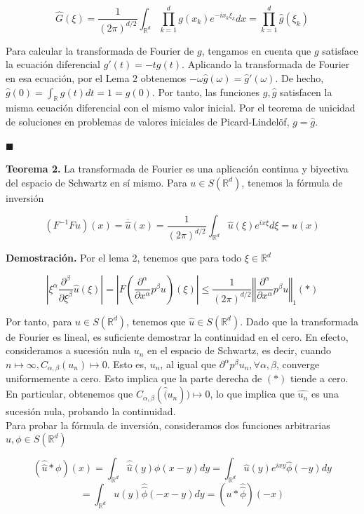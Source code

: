 \begin{itemize}
$$\hat{G}(\xi) = \frac{1}{(2\pi)^{d/2}} \int_{\mathbb{R}^d} \prod_{k=1}^{d} g(x_k) e^{-i x_k \xi_k} dx = \prod_{k=1}^{d} \hat{g}(\xi_k)$$

Para calcular la transformada de Fourier de $g$, tengamos en cuenta que $g$ satisface la ecuación diferencial $g'(t) = -t g(t)$. Aplicando la transformada de Fourier en esa ecuación, por el Lema 2 obtenemos $-\omega \hat{g}(\omega) = \hat{g}'(\omega)$. De hecho, $\hat{g}(0) = \int_{\mathbb{R}}g(t) dt = 1 = g(0)$. Por tanto, las funciones $g,\hat{g}$ satisfacen la misma ecuación diferencial con el mismo valor inicial. Por el teorema de unicidad de soluciones en problemas de valores iniciales de Picard-Lindelöf, $g = \hat{g}$.

\hfill$\blacksquare$

\textbf{Teorema 2.} La transformada de Fourier es una aplicación continua y biyectiva del espacio de Schwartz en sí mismo. Para $u \in S(\mathbb{R}^d)$, tenemos la fórmula de inversión

	$$(F^{-1}Fu)(x) = \overline{\hat{u}}(x)= \frac{1}{(2\pi)^{d/2}} \int_{\mathbb{R}^d} \hat{u}(\xi) e^{ix\xi} d\xi = u(x)$$

\textbf{Demostración.} Por el lema 2, tenemos que para todo $\xi \in \mathbb{R}^d$

$$|\xi^\alpha \frac{\partial^\beta}{\partial \xi^\beta}\hat{u}(\xi)| = |F(\frac{\partial^\alpha}{\partial x^\alpha}p^\beta u)(\xi)| \leq \frac{1}{(2\pi)^{d/2}} \left\Vert \frac{\partial^\alpha}{\partial x^\alpha}p^\beta u \right \Vert_1  (*)$$

Por tanto, para $u \in S(\mathbb{R}^d)$, tenemos que $\hat{u} \in S(\mathbb{R}^d)$. Dado que la transformada de Fourier es lineal, es suficiente demostrar la continuidad en el cero. En efecto, consideramos a sucesión nula ${u_n}$ en el espacio de Schwartz, es decir, cuando $n \mapsto \infty, C_{\alpha,\beta}(u_n) \mapsto 0$. Esto es, ${u_n}$, al igual que ${\partial^\alpha p^\beta u_n}, \forall \alpha, \beta$, converge uniformemente a cero. Esto implica que la parte derecha de $(*)$ tiende a cero. En particular, obtenemos que $C_{\alpha,\beta}(\hat(u_n)) \mapsto 0$, lo que implica que ${\hat{u_n}}$ es una sucesión nula, probando la continuidad. \\

Para probar la fórmula de inversión, consideramos dos funciones arbitrarias $u, \phi \in S(\mathbb{R}^d)$

$$(\hat{\hat{u}}*\phi)(x) = \int_{\mathbb{R}^d} \hat{\hat{u}}(y) \phi(x-y) dy = \int_{\mathbb{R}^d}\hat{u}(y) e^{ixy} \hat{\phi}(-y) dy$$
$$ = \int_{\mathbb{R}^d} u(y) \hat{\hat{\phi}}(-x-y)dy = (u*\hat{\hat{\phi}})(-x)$$


\end{itemize}
